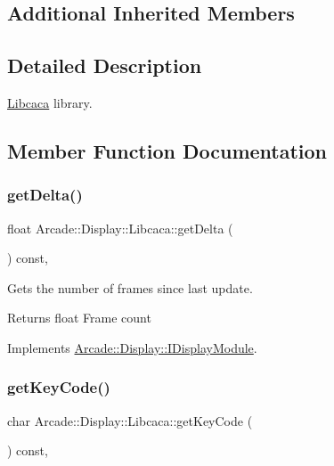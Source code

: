 \subsection*{Additional Inherited Members}


\subsection{Detailed Description}
\mbox{\hyperlink{classArcade_1_1Display_1_1Libcaca}{Libcaca}} library. 

\subsection{Member Function Documentation}
\mbox{\label{classArcade_1_1Display_1_1Libcaca_a6aee007c10e66709680d1ec80f2662a4}} 
\subsubsection{\texorpdfstring{getDelta()}{getDelta()}}
{\footnotesize\ttfamily float Arcade\+::\+Display\+::\+Libcaca\+::get\+Delta (\begin{DoxyParamCaption}{ }\end{DoxyParamCaption}) const\hspace{0.3cm}{\ttfamily [final]}, {\ttfamily [virtual]}}



Gets the number of frames since last update. 

\begin{DoxyReturn}{Returns}
float Frame count 
\end{DoxyReturn}


Implements \mbox{\hyperlink{classArcade_1_1Display_1_1IDisplayModule_aab078d82e6fdd32682553947c20226ac}{Arcade\+::\+Display\+::\+I\+Display\+Module}}.

\mbox{\label{classArcade_1_1Display_1_1Libcaca_a741fdec5c2e77cc7959e5f3444f8c8ac}} 
\subsubsection{\texorpdfstring{getKeyCode()}{getKeyCode()}}
{\footnotesize\ttfamily char Arcade\+::\+Display\+::\+Libcaca\+::get\+Key\+Code (\begin{DoxyParamCaption}{ }\end{DoxyParamCaption}) const\hspace{0.3cm}{\ttfamily [final]}, {\ttfamily [virtual]}}



